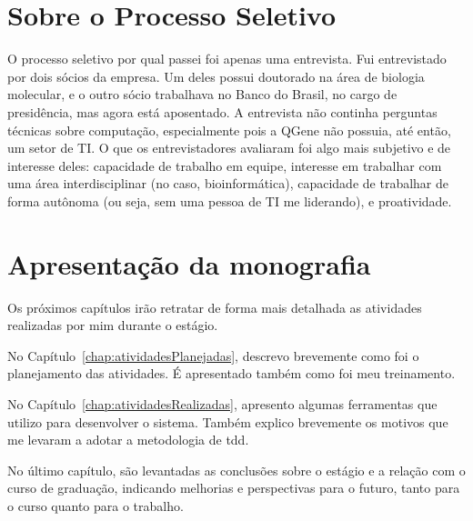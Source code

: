 

\section{Sobre o Processo Seletivo}
O processo seletivo por qual passei foi apenas uma entrevista. Fui entrevistado por dois sócios da empresa. Um deles
possui doutorado na área de biologia molecular, e o outro sócio trabalhava no Banco do Brasil, no cargo de presidência,
mas agora está aposentado. A entrevista não continha perguntas técnicas sobre computação, especialmente pois a QGene não
possuia, até então, um setor de TI. O que os entrevistadores avaliaram foi algo mais subjetivo e de interesse deles:
capacidade de trabalho em equipe, interesse em trabalhar com uma área interdisciplinar (no caso, bioinformática),
capacidade de trabalhar de forma autônoma (ou seja, sem uma pessoa de TI me liderando), e proatividade.


\section{Apresentação da monografia}

Os próximos capítulos irão retratar de forma mais detalhada as atividades realizadas por mim durante o estágio.

No Capítulo~\ref{chap:atividadesPlanejadas}, descrevo brevemente como foi o planejamento das atividades. É apresentado também
como foi meu treinamento.

No Capítulo~\ref{chap:atividadesRealizadas}, apresento algumas ferramentas que utilizo para desenvolver o sistema. Também explico brevemente os motivos
que me levaram a adotar a metodologia de \gls{tdd}.

No último capítulo, são levantadas as conclusões sobre o estágio e a relação com 
o curso de graduação, indicando melhorias e perspectivas para o futuro, tanto para o curso 
quanto para o trabalho.
